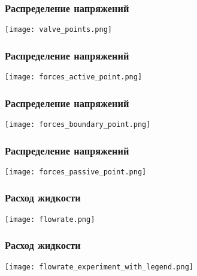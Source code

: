 \documentclass[14pt]{beamer}
\begin{document}
\begin{frame}
\frametitle{Распределение напряжений}
    \begin{center}
        \texttt{[image: valve\_points.png]}
    \end{center}
\end{frame}

\begin{frame}
\frametitle{Распределение напряжений}
    \begin{center}
        \texttt{[image: forces\_active\_point.png]}
    \end{center}
\end{frame}

\begin{frame}
\frametitle{Распределение напряжений}
    \begin{center}
        \texttt{[image: forces\_boundary\_point.png]}
    \end{center}
\end{frame}

\begin{frame}
\frametitle{Распределение напряжений}
    \begin{center}
        \texttt{[image: forces\_passive\_point.png]}
    \end{center}
\end{frame}

\begin{frame}
\frametitle{Расход жидкости}
    \begin{center}
        \texttt{[image: flowrate.png]}
    \end{center}

\end{frame}

\begin{frame}
\frametitle{Расход жидкости}
    \begin{center}
        \texttt{[image: flowrate\_experiment\_with\_legend.png]}
    \end{center}
\end{frame}
\end{document}
